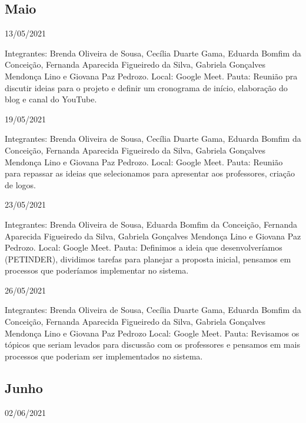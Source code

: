 \begin{apendicesenv}
\begin{flushleft}
 \section{Maio}
 13/05/2021 

Integrantes: Brenda Oliveira de Sousa, Cecília Duarte Gama, Eduarda Bomfim da Conceição, Fernanda Aparecida Figueiredo da Silva, Gabriela Gonçalves Mendonça Lino e Giovana Paz Pedrozo.
\newline
Local: \gls{Google Meet}.
\newline
Pauta: Reunião pra discutir ideias para o projeto e definir um cronograma de início, elaboração do blog e canal do \gls{YouTube}.

19/05/2021 

Integrantes: Brenda Oliveira de Sousa, Cecília Duarte Gama, Eduarda Bomfim da Conceição, Fernanda Aparecida Figueiredo da Silva, Gabriela Gonçalves Mendonça Lino e Giovana Paz Pedrozo.
\newline
Local: \gls{Google Meet}.
\newline
Pauta:  Reunião para repassar as ideias que selecionamos para apresentar aos professores, criação de logos.


23/05/2021 

Integrantes: Brenda Oliveira de Sousa, Eduarda Bomfim da Conceição, Fernanda Aparecida Figueiredo da Silva, Gabriela Gonçalves Mendonça Lino e Giovana Paz Pedrozo.
\newline 
Local: \gls{Google Meet}.
 \newline
Pauta: Definimos a ideia que desenvolveríamos (PETINDER), dividimos tarefas para planejar a proposta inicial, pensamos em processos que poderíamos implementar no sistema.

26/05/2021

Integrantes: Brenda Oliveira de Sousa, Cecília Duarte Gama, Eduarda Bomfim da Conceição, Fernanda Aparecida Figueiredo da Silva, Gabriela Gonçalves Mendonça Lino e Giovana Paz Pedrozo
\newline
Local: \gls{Google Meet}.
\newline
Pauta: Revisamos os tópicos que seriam levados para discussão com os professores e pensamos em mais processos que poderiam ser implementados no sistema.
\end{flushleft}

\begin{flushleft}
 \section{Junho}
 02/06/2021 


\end{flushleft}
\end{apendicesenv}
